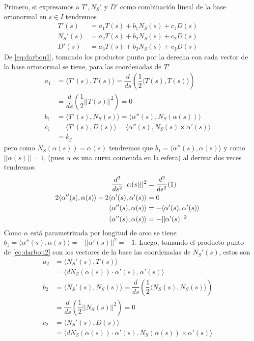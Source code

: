 \documentclass[oneside,11pt]{memoir}
\begin{document}
Primero, si expresamos a $T', N_S'$ y $D'$ como combinación lineal de la base ortonormal en $s\in I$ tendremos
    \begin{align}
        T'(s)&=a_1T(s)+b_1N_S(s)+c_1D(s)\label{eq:darbou1}\\
        N_S'(s)&=a_2T(s)+b_2N_S(s)+c_2D(s)\label{eq:darbou2}\\
        D'(s)&=a_3T(s)+b_3N_S(s)+c_3D(s)\label{eq:darbou3}
    \end{align}
    De \ref{eq:darbou1}, tomando los productos punto por la derecha con cada vector de la base ortonormal se tiene, para las coordenadas de $T'$
    \begin{align*}
        a_1&=\langle T'(s), T(s) \rangle =\dfrac{d}{ds}\left( \dfrac{1}{2} \langle T(s), T(s) \rangle \right)\\
        &= \dfrac{d}{ds}\left( \dfrac{1}{2} ||T(s) ||^2 \right)=0\\
        b_1&=\langle T'(s), N_S(s) \rangle=\langle \alpha''(s), N_S(\alpha(s)) \rangle  \\
        c_1&=\langle T'(s), D(s) \rangle = \langle \alpha''(s), N_S(s)\times \alpha'(s) \rangle\\
        &= k_g
    \end{align*}
   pero como $N_S(\alpha(s))=\alpha(s)$ tendremos que $b_1= \langle \alpha''(s), \alpha(s) \rangle$ y como $||\alpha(s)||=1$, (pues $\alpha$ es una curva contenida en la esfera) al derivar dos veces tendremos
   \begin{align}
       \dfrac{d^2}{ds^2}||\alpha(s)||^2&= \dfrac{d^2}{ds^2}(1) \notag\\
       2\langle \alpha''(s),\alpha(s)\rangle+2\langle \alpha'(s),\alpha'(s)\rangle&=0 \notag\\
       \langle \alpha''(s),\alpha(s)\rangle&=-\langle \alpha'(s),\alpha'(s)\rangle \notag\\
       \langle \alpha''(s),\alpha(s)\rangle&=-||\alpha'(s)||^2.\label{eq: relacionesalfa1}
    \end{align}
     Como $\alpha$ está parametrizada por longitud de arco se tiene $b_1=\langle \alpha''(s),\alpha(s)\rangle=-||\alpha'(s)||^2=-1$. 
     Luego, tomando el producto punto de \ref{eq:darbou2} con los vectores de la base las coordenadas de $N_S'(s)$, estos son
    \begin{align*}
        a_2&=\langle N_S'(s), T(s) \rangle\\
        &= \langle dN_S(\alpha(s))\cdot \alpha'(s), \alpha'(s) \rangle\\
        b_2&=\langle N_S'(s), N_S(s) \rangle= \dfrac{d}{ds}\left( \dfrac{1}{2} \langle N_S(s), N_S(s) \rangle \right)\\
        &= \dfrac{d}{ds}\left( \dfrac{1}{2} ||N_S(s) ||^2 \right)=0\\
        c_2&=\langle N_S'(s), D(s) \rangle\\
        &= \langle dN_S(\alpha(s))\cdot \alpha'(s), N_S(\alpha(s))\times \alpha'(s) \rangle
    \end{align*} 
\end{document}
